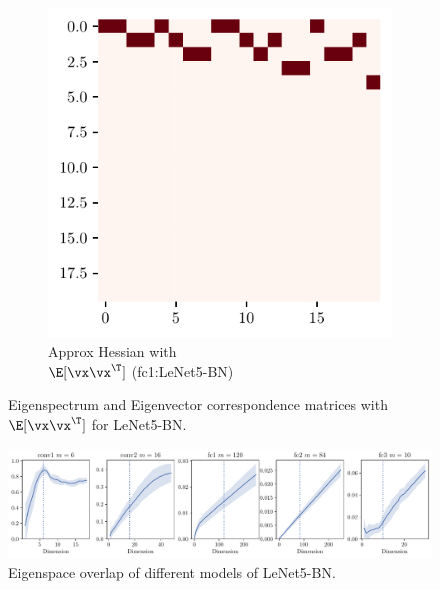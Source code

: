 \begin{figure}[ht]
\begin{subfigure}[b]{0.25\textwidth}
    \label{fig:app_exp_bn_corr_true}
\end{subfigure}%
\begin{subfigure}[b]{0.25\textwidth}
    \includegraphics[width=\textwidth]{Appendix_Figures/Explanation_LeNet5Case/BN/xxT_Approxest_real_corr_expand_t20_CIFAR10_Exp1_LeNet5_BN_nl_fixlr0.01R2_E-1_fc1.pdf}
    \caption{Approx Hessian with\\ $\E[\vx\vx^\T]$ (fc1:LeNet5-BN)}
    \label{fig:app_exp_bn_corr_est}
\end{subfigure}
\label{fig:app_exp_bn_corr}
\caption{Eigenspectrum and Eigenvector correspondence matrices with $\E[\vx\vx^\T]$ for LeNet5-BN.}
\end{figure}
\begin{figure}[ht]
    \centering
    \includegraphics[width=\textwidth]{Appendix_Figures/Explanation_LeNet5Case/BN/DimOverlap_CIFAR10_LeNet5_BN_nl_fixlr0.01_appendix_full.pdf}
    \caption{Eigenspace overlap of different models of LeNet5-BN.}
    \label{fig:app_exp_bn_overlap}
\end{figure}

